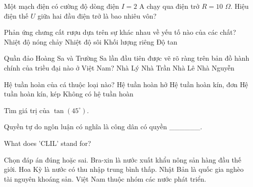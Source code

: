 \begin{ex}
    Một mạch điện có cường độ dòng điện $I = 2$ A chạy qua điện trở $R = 10$ $\Omega$. Hiệu điện thế $U$ giữa hai đầu điện trở là bao nhiêu vôn?
\end{ex}
\begin{ex}
    Phản ứng chưng cất rượu dựa trên sự khác nhau về yếu tố nào của các chất?
    \choice
    {Nhiệt độ nóng chảy}
    {\True Nhiệt độ sôi}
    {Khối lượng riêng}
    {Độ tan}
\end{ex}
\begin{ex}
    Quần đảo Hoàng Sa và Trường Sa lần đầu tiên được vẽ rõ ràng trên bản đồ hành chính của triều đại nào ở Việt Nam?
    \choice
    {Nhà Lý}
    {Nhà Trần}
    {Nhà Lê}
    {\True Nhà Nguyễn}
\end{ex}
\begin{ex}
    Hệ tuần hoàn của cá thuộc loại nào?
    \choice
    {Hệ tuần hoàn hở}
    {\True Hệ tuần hoàn kín, đơn}
    {Hệ tuần hoàn kín, kép}
    {Không có hệ tuần hoàn}
\end{ex}
\begin{ex}
    Tìm giá trị của $\tan(45^\circ)$.
\end{ex}
\begin{ex}
    Quyền tự do ngôn luận có nghĩa là công dân có quyền ______.
\end{ex}
\begin{ex}
    What does 'CLIL' stand for?
\end{ex}
\begin{ex}
    Chọn đáp án đúng hoặc sai.
    \choiceTF
    {\True Bra-xin là nước xuất khẩu nông sản hàng đầu thế giới.}
    {Hoa Kỳ là nước có thu nhập trung bình thấp.}
    {\True Nhật Bản là quốc gia nghèo tài nguyên khoáng sản.}
    {Việt Nam thuộc nhóm các nước phát triển.}
\end{ex}
